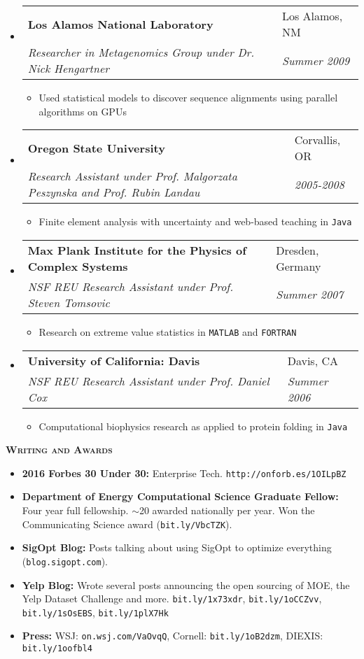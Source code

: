 \documentclass[11pt]{article}
\makeatletter
\newcommand{\resitem}[1]{\item #1 \vspace{-2pt}}
\newcommand{\resheading}[1]{%
  \begin{tcolorbox}
    \textsc{\textbf{\large{#1}}}
  \end{tcolorbox}
}
\newcommand{\ressubheading}[4]{%
  \begin{tabularx}{\linewidth}{@{}Xl@{}}
    \textbf{#1} & #2          \\
    \textit{#3} & \textit{#4} \\
  \end{tabularx}
}
\makeatother
\begin{document}
\begin{itemize}
\item 
	\ressubheading{Los Alamos National Laboratory}{Los Alamos, NM}{Researcher in Metagenomics Group under Dr. Nick Hengartner}{Summer 2009}
	\begin{itemize}
    \resitem{Used statistical models to discover sequence alignments using parallel algorithms on GPUs}
	\end{itemize}

\item
	\ressubheading{Oregon State University}{Corvallis, OR}{Research Assistant under Prof. Malgorzata Peszynska and Prof. Rubin Landau}{2005-2008}
	\begin{itemize}
		\resitem{Finite element analysis with uncertainty and web-based teaching in \texttt{Java}}
	\end{itemize}

\item
	\ressubheading{Max Plank Institute for the Physics of Complex Systems}{Dresden, Germany}{NSF REU Research Assistant under Prof. Steven Tomsovic}{Summer 2007}
	\begin{itemize}
		\resitem{Research on extreme value statistics in \texttt{MATLAB} and \texttt{FORTRAN}}
	\end{itemize}

\item
	\ressubheading{University of California: Davis}{Davis, CA}{NSF REU Research Assistant under Prof. Daniel Cox}{Summer 2006}
	\begin{itemize}
		\resitem{Computational biophysics research as applied to protein folding in \texttt{Java}}
	\end{itemize}

\end{itemize}

\resheading{Writing and Awards}

\begin{itemize}

\item {\bf 2016 Forbes 30 Under 30:} Enterprise Tech. \texttt{http://onforb.es/1OILpBZ}
\item {\bf Department of Energy Computational Science Graduate Fellow:} Four year full fellowship. $\sim$20 awarded nationally per year. Won the Communicating Science award (\texttt{bit.ly/VbcTZK}).
\item {\bf SigOpt Blog:} Posts talking about using SigOpt to optimize everything (\texttt{blog.sigopt.com}).
\item {\bf Yelp Blog:} Wrote several posts announcing the open sourcing of MOE, the Yelp Dataset Challenge and more. \texttt{bit.ly/1x73xdr}, \texttt{bit.ly/1oCCZvv}, \texttt{bit.ly/1sOsEBS}, \texttt{bit.ly/1plX7Hk}
\item {\bf Press:} WSJ: \texttt{on.wsj.com/VaOvqQ}, Cornell: \texttt{bit.ly/1oB2dzm},  DIEXIS: \texttt{bit.ly/1oofbl4}

\end{itemize}
\end{document}
